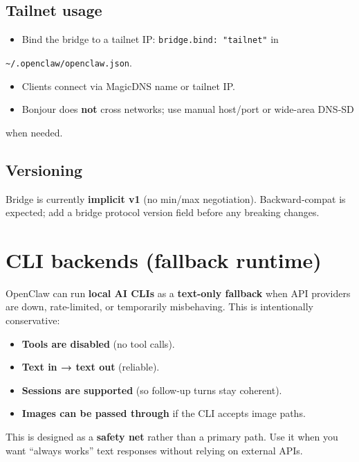 \subsection{Tailnet usage}


\begin{itemize}
  \item Bind the bridge to a tailnet IP: \texttt{bridge.bind: "tailnet"} in
\end{itemize}

\texttt{\textasciitilde{}/.openclaw/openclaw.json}.
\begin{itemize}
  \item Clients connect via MagicDNS name or tailnet IP.
  \item Bonjour does \textbf{not} cross networks; use manual host/port or wide-area DNS‑SD
\end{itemize}

when needed.

\subsection{Versioning}


Bridge is currently \textbf{implicit v1} (no min/max negotiation). Backward‑compat
is expected; add a bridge protocol version field before any breaking changes.


\clearpage

\section{CLI backends (fallback runtime)}


OpenClaw can run \textbf{local AI CLIs} as a \textbf{text-only fallback} when API providers are down,
rate-limited, or temporarily misbehaving. This is intentionally conservative:

\begin{itemize}
  \item \textbf{Tools are disabled} (no tool calls).
  \item \textbf{Text in → text out} (reliable).
  \item \textbf{Sessions are supported} (so follow-up turns stay coherent).
  \item \textbf{Images can be passed through} if the CLI accepts image paths.
\end{itemize}


This is designed as a \textbf{safety net} rather than a primary path. Use it when you
want “always works” text responses without relying on external APIs.

